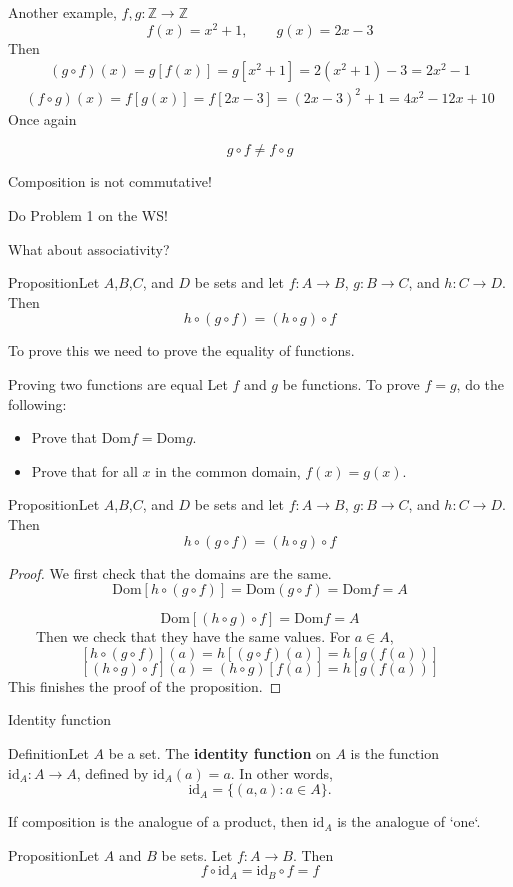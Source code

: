 \documentclass{beamer}
\def\bl[#1]#2{\begin{block}{#1}#2\end{block}}
\def\itemb{\begin{itemize}}
\def\iteme{\end{itemize}}
\begin{document}
\begin{frame}
Another example, $f,g:\mathbb{Z}\to\mathbb{Z}$
\[
f(x)=x^2+1,\qquad g(x)=2x-3
\]
Then
\begin{align*}
(g\circ f)(x)=g[f(x)]=g[x^2+1]=2(x^2+1)-3=2x^2-1
\end{align*}
\begin{align*}
(f\circ g)(x)=f[g(x)]=f[2x-3]=(2x-3)^2+1=4x^2-12x+10
\end{align*}
Once again 
\bl[]{\[
g\circ f\neq f\circ g
\]}
\center\color{red}Composition is not commutative!\color{black}

\begin{center}{Do Problem 1 on the WS!}\end{center}
\end{frame}

\begin{frame}
What about associativity?
\bl[Proposition]{Let $A$,$B$,$C$, and $D$ be sets and let $f:A\to B$, $g:B\to C$, and $h:C\to D$. Then
\[
h\circ(g\circ f)=(h\circ g)\circ f
\]}
To prove this we need to prove the equality of functions.
\bl[Proving two functions are equal]{
Let $f$ and $g$ be functions. To prove $f=g$, do the following:
\itemb
\item Prove that $\textrm{Dom}f=\textrm{Dom}g$.
\item Prove that for all $x$ in the common domain, $f(x)=g(x)$.
\iteme}
\end{frame}

\begin{frame}
\bl[Proposition]{Let $A$,$B$,$C$, and $D$ be sets and let $f:A\to B$, $g:B\to C$, and $h:C\to D$. Then\vspace{-0.3cm}
\[
h\circ(g\circ f)=(h\circ g)\circ f
\]}
\begin{proof}
We first check that the domains are the same.\vspace{-0.3cm}
\[
\textrm{Dom}[h\circ(g\circ f)]=\textrm{Dom}(g\circ f)=\textrm{Dom}f=A
\]\vspace{-1cm}

\[
\textrm{Dom}[(h\circ g)\circ f]=\textrm{Dom}f=A
\]
~~~~Then we check that they have the same values. For $a\in A$,
\[
[h\circ(g\circ f)](a)=h[(g\circ f)(a)]=h[g(f(a))]
\]
\[
[(h\circ g)\circ f](a)=(h\circ g)[f(a)]=h[g(f(a))]
\]
This finishes the proof of the proposition.
\end{proof}
\end{frame}

\begin{frame}{Identity function}
\bl[Definition]{Let $A$ be a set. The \textbf{identity function} on $A$ is the function $\textrm{id}_A:A\to A$, defined by $\textrm{id}_A(a)=a$. In other words,
\[
\textrm{id}_A=\{(a,a):a\in A\}.
\]}
If composition is the analogue of a product, then $\textrm{id}_A$ is the analogue of `one`.
\bl[Proposition]{Let $A$ and $B$ be sets. Let $f:A\to B$. Then
\[
f\circ\textrm{id}_A=\textrm{id}_B\circ f=f
\]}
\end{frame}
\end{document}
